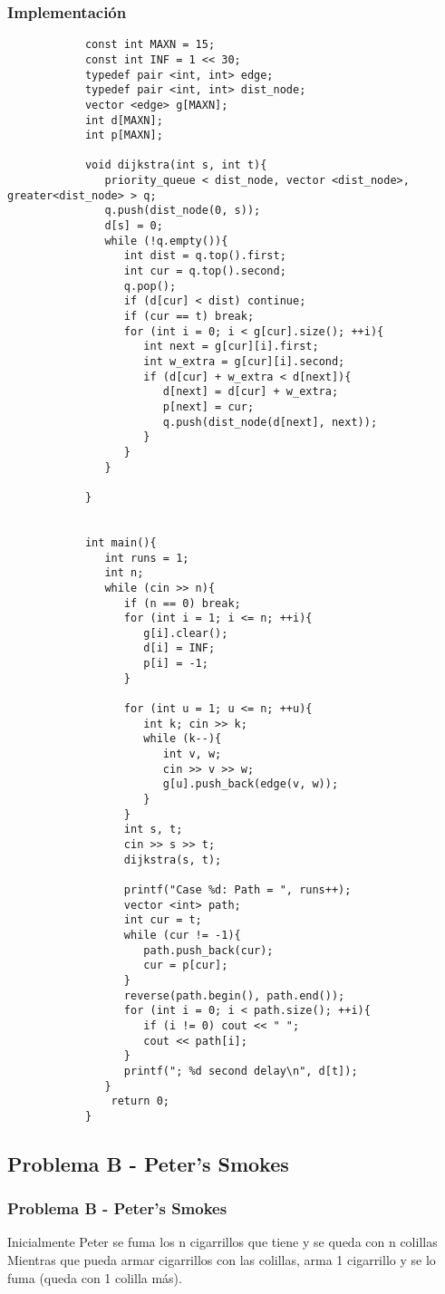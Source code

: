 \documentclass{beamer}
\begin{document}
	\begin{frame}
		\frametitle{Implementación}
		\begin{lstlisting}
			const int MAXN = 15;
			const int INF = 1 << 30;
			typedef pair <int, int> edge;
			typedef pair <int, int> dist_node;
			vector <edge> g[MAXN];
			int d[MAXN];
			int p[MAXN];

			void dijkstra(int s, int t){
			   priority_queue < dist_node, vector <dist_node>, greater<dist_node> > q;
			   q.push(dist_node(0, s));
			   d[s] = 0;
			   while (!q.empty()){
			      int dist = q.top().first;
			      int cur = q.top().second;
			      q.pop();
			      if (d[cur] < dist) continue;
			      if (cur == t) break;
			      for (int i = 0; i < g[cur].size(); ++i){
			         int next = g[cur][i].first;
			         int w_extra = g[cur][i].second;
			         if (d[cur] + w_extra < d[next]){
			            d[next] = d[cur] + w_extra;
			            p[next] = cur;
			            q.push(dist_node(d[next], next));
			         }
			      }
			   }

			}


			int main(){
			   int runs = 1;
			   int n;
			   while (cin >> n){
			      if (n == 0) break;
			      for (int i = 1; i <= n; ++i){
			         g[i].clear();
			         d[i] = INF;
			         p[i] = -1;
			      }

			      for (int u = 1; u <= n; ++u){
			         int k; cin >> k;
			         while (k--){
			            int v, w;
			            cin >> v >> w;
			            g[u].push_back(edge(v, w));
			         }
			      }
			      int s, t;
			      cin >> s >> t;
			      dijkstra(s, t);

			      printf("Case %d: Path = ", runs++);
			      vector <int> path;
			      int cur = t;
			      while (cur != -1){
			         path.push_back(cur);
			         cur = p[cur];
			      }
			      reverse(path.begin(), path.end());
			      for (int i = 0; i < path.size(); ++i){
			         if (i != 0) cout << " ";
			         cout << path[i];
			      }
			      printf("; %d second delay\n", d[t]);
			   }
			    return 0;
			}
		\end{lstlisting}
	\end{frame}
	
	\subsection{Problema B - Peter's Smokes}
	\begin{frame}
		\frametitle{Problema B - Peter's Smokes}
		Inicialmente Peter se fuma los n cigarrillos que tiene y se queda con n colillas\\
		Mientras que pueda armar cigarrillos con las colillas, arma 1 cigarrillo y se lo fuma (queda con 1 colilla más).
	\end{frame}
	
\end{document}
